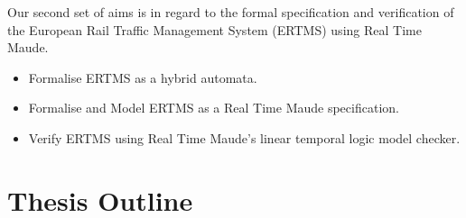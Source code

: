 Our second set of aims is in regard to the formal specification and verification of the European Rail Traffic Management System (ERTMS) using Real Time Maude.

\begin{itemize}

\item Formalise ERTMS as a hybrid automata.

\item Formalise and Model ERTMS as a Real Time Maude specification.

\item Verify ERTMS using Real Time Maude's linear temporal logic model checker.

\end{itemize}




\section{Thesis Outline}


